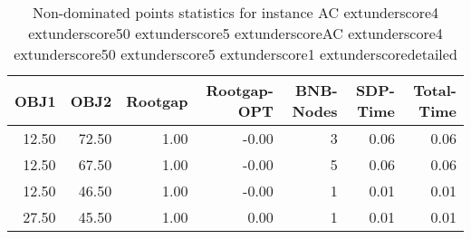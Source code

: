\begin{table}
\caption{Non-dominated points statistics for instance AC	extunderscore4	extunderscore50	extunderscore5	extunderscoreAC	extunderscore4	extunderscore50	extunderscore5	extunderscore1	extunderscoredetailed}
\label{tab:stats/AC_4_50_5_AC_4_50_5_1_detailed}
\begin{tabular}{rrrrrrr}
\toprule
OBJ1 & OBJ2 & Rootgap & Rootgap-OPT & BNB-Nodes & SDP-Time & Total-Time \\
\midrule
12.50 & 72.50 & 1.00 & -0.00 & 3 & 0.06 & 0.06 \\
12.50 & 67.50 & 1.00 & -0.00 & 5 & 0.06 & 0.06 \\
12.50 & 46.50 & 1.00 & -0.00 & 1 & 0.01 & 0.01 \\
27.50 & 45.50 & 1.00 & 0.00 & 1 & 0.01 & 0.01 \\
\bottomrule
\end{tabular}
\end{table}
